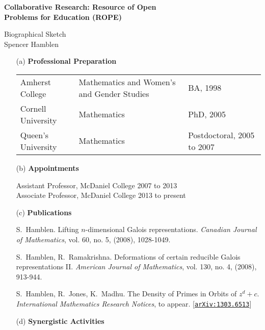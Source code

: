 \documentclass[11pt]{article}
\begin{document}
\begin{center}
{\Large \textbf{Collaborative Research: Resource of Open\\
Problems for Education (ROPE)}}

\bigskip

{\Large Biographical Sketch}\\
\smallskip
Spencer Hamblen
\end{center}

\begin{enumerate}[leftmargin=*]

\item[(a)] \textbf{Professional Preparation}

\begin{tabularx}{6.4in}{XXX}
Amherst College  & Mathematics and Women's and Gender Studies & \hfill BA, 1998\\
Cornell University & Mathematics & \hfill PhD, 2005 \\
Queen's University & Mathematics & \hfill Postdoctoral, 2005 to 2007\\
\end{tabularx}

\item[(b)] \textbf{Appointments}

Assistant Professor, McDaniel College  \hfill 2007 to 2013\\
Associate Professor, McDaniel College  \hfill 2013 to present\\



\item[(c)] \textbf{Publications}


S.~Hamblen.  Lifting $n$-dimensional Galois representations. {\em Canadian Journal of Mathematics}, vol. 60, no. 5, (2008), 1028-1049.

\smallskip

S.~Hamblen, R.~Ramakrishna.  Deformations of certain reducible Galois representations II. {\em American Journal of Mathematics}, vol. 130, no. 4, (2008), 913-944.

\smallskip

S.~Hamblen, R.~Jones, K.~Madhu. The Density of Primes in Orbits of $z^d + c$.  {\em International Mathematics Research Notices}, to appear.  [\href{http://arxiv.org/abs/1303.6513}{\texttt{arXiv:1303.6513}}]


 
\item[(d)] \textbf{Synergistic Activities}


\end{enumerate}
\end{document}
